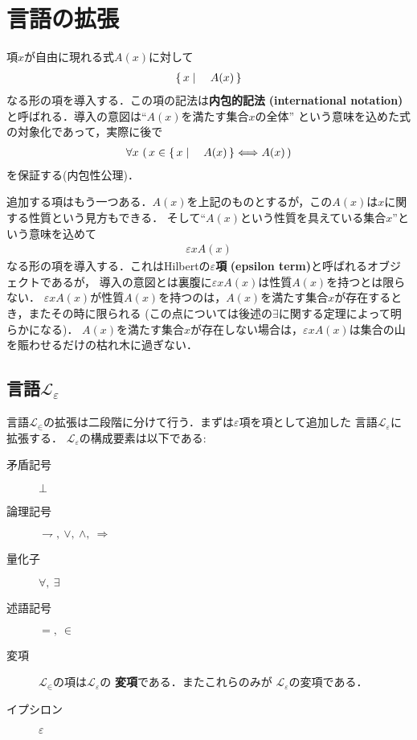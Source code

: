 \section{言語の拡張}
	項$x$が自由に現れる式$A(x)$に対して
	\begin{align}
		\left\{\, x \mid \quad A(x)\, \right\}
	\end{align}
	なる形の項を導入する．この項の記法は{\bf 内包的記法}
	{\bf (international notation)}と呼ばれる．導入の意図は``$A(x)$を満たす集合$x$の全体''
	という意味を込めた式の対象化であって，実際に後で
	\begin{align}
		\forall x\, \left(\, x \in \left\{\, x \mid \quad A(x)\, \right\} \Longleftrightarrow A(x)\, \right)
	\end{align}
	を保証する(内包性公理)．
	
	追加する項はもう一つある．$A(x)$を上記のものとするが，この$A(x)$は$x$に関する性質という見方もできる．
	そして``$A(x)$という性質を具えている集合$x$''という意味を込めて
	\begin{align}
		\varepsilon x A(x)
	\end{align}
	なる形の項を導入する．これはHilbertの{\bf $\varepsilon$項}
	{\bf (epsilon term)}と呼ばれるオブジェクトであるが，
	導入の意図とは裏腹に$\varepsilon x A(x)$は性質$A(x)$を持つとは限らない．
	$\varepsilon x A(x)$が性質$A(x)$を持つのは，$A(x)$を満たす集合$x$が存在するとき，またその時に限られる
	(この点については後述の$\exists$に関する定理によって明らかになる)．
	$A(x)$を満たす集合$x$が存在しない場合は，$\varepsilon x A(x)$は集合の山を賑わせるだけの枯れ木に過ぎない．
	
\subsection{言語$\mathcal{L}_{\varepsilon}$}
	言語$\mathcal{L}_{\in}$の拡張は二段階に分けて行う．まずは$\varepsilon$項を項として追加した
	言語$\mathcal{L}_{\varepsilon}$に拡張する．
	$\mathcal{L}_{\varepsilon}$の構成要素は以下である:
	
	\begin{description}
		\item[矛盾記号] $\bot$
		\item[論理記号] $\rightharpoondown,\ \vee,\ \wedge,\ \Longrightarrow$
		\item[量化子] $\forall,\ \exists$
		\item[述語記号] $=,\ \in$
		\item[変項] $\mathcal{L}_{\in}$の項は$\mathcal{L}_{\varepsilon}$の
			{\bf 変項}である．またこれらのみが
			$\mathcal{L}_{\varepsilon}$の変項である．
		\item[イプシロン] $\varepsilon$
	\end{description}
	
